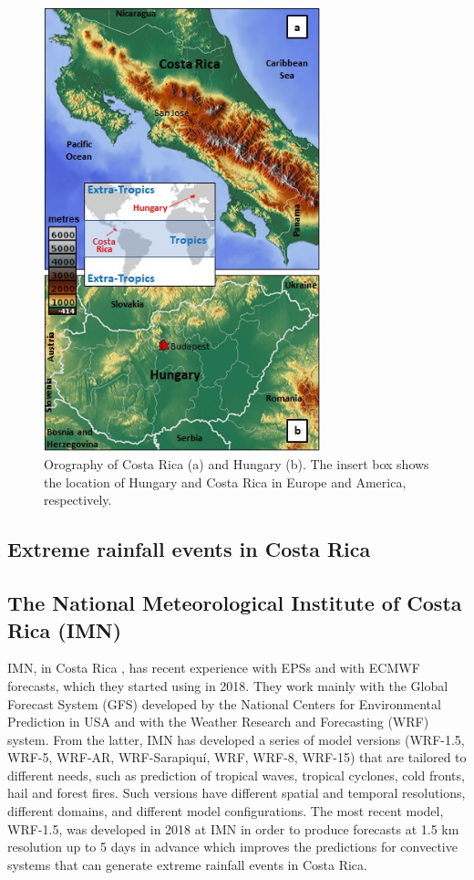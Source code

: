 \documentclass[twocol]{ametsocV5} %
\begin{document}
\begin{figure}
\centerline{\includegraphics[width=19pc]{manuscript/Figures/Fig2.jpg}}
\caption{Orography of Costa Rica (a) and Hungary (b). The insert box shows the location of Hungary and Costa Rica in Europe and America, respectively.}
\label{Fig2}
\end{figure}

\subsection{Extreme rainfall events in Costa Rica}

\subsection{ The National Meteorological Institute of Costa Rica (IMN)} 
IMN, in Costa Rica , has recent experience with EPSs and with ECMWF forecasts, which they started using in 2018. They work mainly with the Global Forecast System (GFS) developed by the National Centers for Environmental Prediction in USA and with the Weather Research and Forecasting (WRF) system. From the latter, IMN has developed a series of model versions (WRF-1.5, WRF-5, WRF-AR, WRF-Sarapiquí, WRF, WRF-8, WRF-15) that are tailored to different needs, such as prediction of tropical waves, tropical cyclones, cold fronts, hail and forest fires. Such versions have different spatial and temporal resolutions, different domains, and different model configurations. The most recent model, WRF-1.5, was developed in 2018 at IMN in order to produce forecasts at 1.5 km resolution up to 5 days in advance which improves the predictions for convective systems that can generate extreme rainfall events in Costa Rica. 
\end{document}
